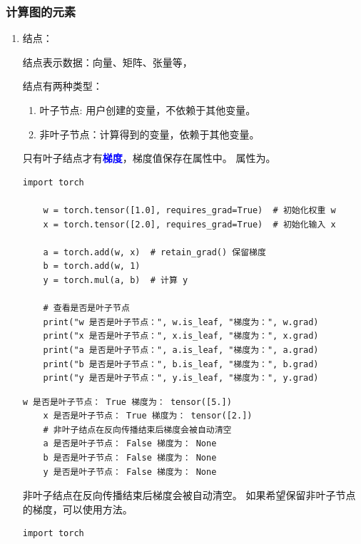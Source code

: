 \subsubsection{计算图的元素}
\label{subsubsec:Pytorch的计算图的元素}
\begin{enumerate}[label=\arabic*)]
    \item 结点：

    结点表示\textcolor{YBXPurple}{数据}：向量、矩阵、张量等，
    
    结点有两种类型：
    \begin{enumerate}[itemindent=1em,label=\arabic*)]
        \item 叶子节点: 用户创建的变量，不依赖于其他变量。

        \item 非叶子节点：计算得到的变量，依赖于其他变量。
    \end{enumerate}

    只有叶子结点才有\textcolor{blue}{\textbf{梯度}}，梯度值保存在属性中。
    属性为。

    \begin{lstlisting}[style=pythonstyle]
    import torch

    w = torch.tensor([1.0], requires_grad=True)  # 初始化权重 w
    x = torch.tensor([2.0], requires_grad=True)  # 初始化输入 x

    a = torch.add(w, x)  # retain_grad() 保留梯度
    b = torch.add(w, 1)
    y = torch.mul(a, b)  # 计算 y

    # 查看是否是叶子节点
    print("w 是否是叶子节点：", w.is_leaf, "梯度为：", w.grad)
    print("x 是否是叶子节点：", x.is_leaf, "梯度为：", x.grad)
    print("a 是否是叶子节点：", a.is_leaf, "梯度为：", a.grad)
    print("b 是否是叶子节点：", b.is_leaf, "梯度为：", b.grad)
    print("y 是否是叶子节点：", y.is_leaf, "梯度为：", y.grad)
    \end{lstlisting}
    \begin{lstlisting}[style=demostyle,numbers=none]
    w 是否是叶子节点： True 梯度为： tensor([5.])
    x 是否是叶子节点： True 梯度为： tensor([2.])
    # 非叶子结点在反向传播结束后梯度会被自动清空
    a 是否是叶子节点： False 梯度为： None 
    b 是否是叶子节点： False 梯度为： None
    y 是否是叶子节点： False 梯度为： None
    \end{lstlisting}

    非叶子结点在反向传播结束后梯度会被自动清空。
    如果希望保留非叶子节点的梯度，可以使用方法。
    \begin{lstlisting}[style=pythonstyle]
    import torch


\end{lstlisting}
\end{enumerate}

